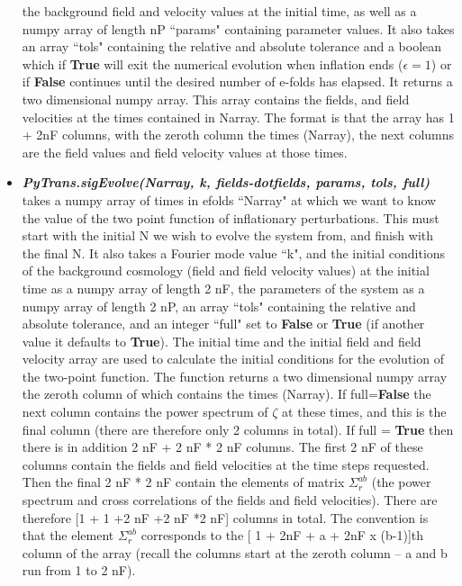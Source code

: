 \documentclass[10pt,
amsmath,amssymb,
aps,prd,nofootinbib,eqsecnum,a4paper]{revtex4}
\begin{document}
\begin{itemize}
    the background field and velocity values at the initial time, as well as 
    a numpy array of length nP  ``params" containing parameter values.
It also takes an array ``tols" containing the relative and absolute tolerance and a boolean which if {\color{blue}\bf{True}} will exit the numerical evolution when inflation ends ($\epsilon =1$) or if {\color{blue}\bf{False}} continues until the desired number of e-folds has elapsed.
      It returns a two dimensional numpy array. 
    This array contains the fields, and field velocities at the times contained in  
    Narray. The format is that the array has 1 + 2nF columns, with the zeroth column the 
    times (Narray), the next 
    columns are the field values and field velocity values at those times. 
\item  {\it \bf PyTrans.sigEvolve(Narray, k, fields-dotfields, params, tols, full)} takes a numpy array of times in efolds ``Narray" 
    at which we want to know the value of the two point function of inflationary perturbations. 
    This must start with the initial N we wish to evolve the system from, and finish with the 
    final N. It also takes a Fourier mode value 
    ``k", and the initial conditions of the background cosmology (field and field velocity values) at the initial time  
    as a numpy array of length 2 nF, the parameters of the system as a numpy array of length 2 nP, an array ``tols" containing the relative and absolute tolerance,
    and an integer ``full" set to {\color{blue}\bf{False}} or {\color{blue}\bf{True}}
    (if another value it defaults to {\color{blue}\bf{True}}). The initial time and the initial field and field velocity array 
    are used to calculate the initial conditions for the evolution of the two-point function. 
    The function returns a two dimensional numpy array 
     the zeroth column of which contains the times (Narray). If full={\color{blue}\bf{False}} the 
     next column contains the power spectrum 
     of $\zeta$ at these times, and this is the final column 
     (there are therefore only 2 columns in total).
     If full = {\color{blue}\bf{True}} then there is in addition 2 nF + 2 nF * 2 nF columns. The first 2 nF of these columns 
     contain 
     the fields and field velocities at the time steps requested. Then the final 2 nF * 2 nF
 contain  the  elements of matrix $\Sigma_r^{ab}$ (the power 
     spectrum and cross correlations of the fields and field velocities). There are therefore [1 + 1 +2 nF +2 nF *2 nF] columns in total.
  	The convention is that the element $\Sigma_r^{ab}$ corresponds to the [ 1 + 2nF  + a + 
    2nF x (b-1)]th column of the array (recall the columns start at the zeroth column -- a and b run from 1 to 2 nF). 


\end{itemize}
\end{document}

